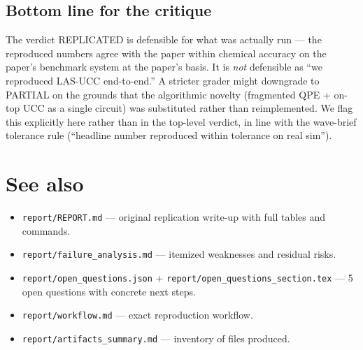 \documentclass[11pt]{article}
\begin{document}
\subsection{Bottom line for the critique}
The verdict REPLICATED is defensible for what was actually run --- the reproduced numbers agree with the paper within chemical accuracy on the paper's benchmark system at the paper's basis. It is \emph{not} defensible as ``we reproduced LAS-UCC end-to-end.'' A stricter grader might downgrade to PARTIAL on the grounds that the algorithmic novelty (fragmented QPE + on-top UCC as a single circuit) was substituted rather than reimplemented. We flag this explicitly here rather than in the top-level verdict, in line with the wave-brief tolerance rule (``headline number reproduced within tolerance on real sim'').

\section{See also}
\begin{itemize}
    \item \texttt{report/REPORT.md} --- original replication write-up with full tables and commands.
    \item \texttt{report/failure\_analysis.md} --- itemized weaknesses and residual risks.
    \item \texttt{report/open\_questions.json} + \texttt{report/open\_questions\_section.tex} --- 5 open questions with concrete next steps.
    \item \texttt{report/workflow.md} --- exact reproduction workflow.
    \item \texttt{report/artifacts\_summary.md} --- inventory of files produced.
\end{itemize}
\end{document}
